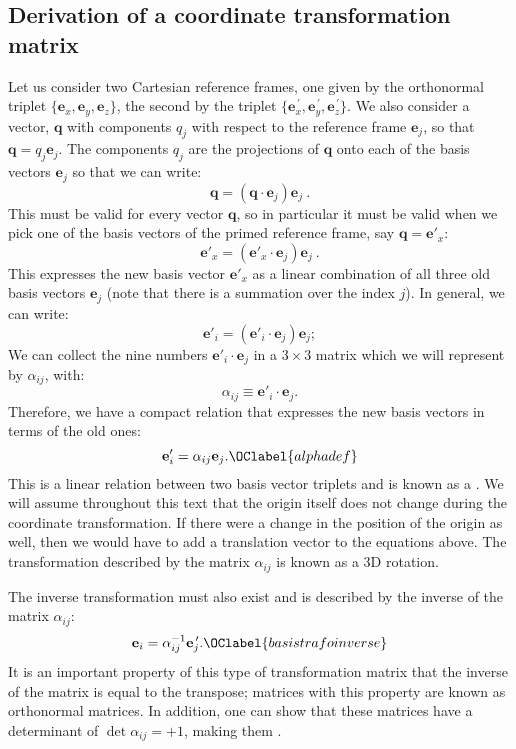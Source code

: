 \subsection{Derivation of a coordinate transformation matrix}

Let us consider two Cartesian reference frames, one given by the orthonormal triplet $\{\mathbf{e}_x,\mathbf{e}_y,\mathbf{e}_z\}$, the second by the triplet 
$\{\mathbf{e}_x^{\,\prime},\mathbf{e}_y^{\,\prime},\mathbf{e}_z^{\,\prime}\}$.  We also consider a vector, $\mathbf{q}$ with components $q_j$ with respect to the reference frame $\mathbf{e}_j$, so that $\mathbf{q}=q_j\mathbf{e}_j$.  The components $q_j$ are the projections of $\mathbf{q}$ onto each of the basis vectors $\mathbf{e}_j$ so that we can write:
\[
	\mathbf{q} = (\mathbf{q}\cdot\mathbf{e}_j) \mathbf{e}_j\ .
\]
This must be valid for every vector $\mathbf{q}$, so in particular it must be valid when we pick one of the basis vectors of the primed reference frame, say $\mathbf{q}=\mathbf{e}'_x$:
\[
	\mathbf{e}'_x = (\mathbf{e}'_x\cdot\mathbf{e}_j) \mathbf{e}_j\ .
\]
This expresses the new basis vector $\mathbf{e}'_x$ as a linear combination of all three old basis vectors $\mathbf{e}_j$ (note that there is a summation over the index $j$).
In general, we can write:
\[
	\mathbf{e}'_i = (\mathbf{e}'_i\cdot\mathbf{e}_j) \mathbf{e}_j;
\]
We can collect the nine numbers $\mathbf{e}'_i\cdot\mathbf{e}_j$ in a $3\times 3$ matrix which we will represent by $\alpha_{ij}$, with:
\[	
	\alpha_{ij} \equiv \mathbf{e}'_i\cdot\mathbf{e}_j.
\]
Therefore, we have a compact relation that expresses the new basis vectors in terms of the old ones:
\begin{equation}
	\mathbf{e}'_i = \alpha_{ij}\mathbf{e}_j.\OClabel{alphadef}
\end{equation}
This is a linear relation between two basis vector triplets and is known as a .  We will assume throughout this text that the origin itself does not change during the coordinate transformation.  If there were a change in the position of the origin as well, then we would have to add a translation vector to the equations above.  The transformation described by the matrix $\alpha_{ij}$ is known as a 3D rotation.
 
The inverse transformation must also exist and is described by the inverse of the matrix $\alpha_{ij}$:
\begin{equation}
	\mathbf{e}_i=\alpha^{-1}_{ij}\mathbf{e}_{j}^{\,\prime}.\OClabel{basistrafoinverse}
\end{equation}
It is an important property of this type of transformation matrix that the inverse of the matrix is equal to the transpose; matrices with this property are known as orthonormal matrices. In addition, one can show that these matrices have a determinant of $\det\alpha_{ij}=+1$, making them .


